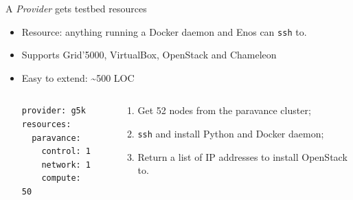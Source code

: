 \documentclass[10pt]{beamer}
\begin{document}
\begin{frame}[fragile]{\insertsectionhead}
  A \emph{Provider} gets testbed resources
  \begin{itemize}
	 \item Resource: anything running a Docker daemon and Enos can \texttt{ssh} to.
  \item Supports Grid'5000, VirtualBox, OpenStack and Chameleon
  \item Easy to extend: \textasciitilde 500 LOC
  \medskip
  \begin{columns}
    \footnotesize
    \begin{column}{.3\textwidth}
  \begin{lstlisting}
provider: g5k
resources:
  paravance:
    control: 1
    network: 1
    compute: 50
  \end{lstlisting}
    \end{column}
    \begin{column}{.05\textwidth}
      \Rightarrow
    \end{column}
    \begin{column}{.6\textwidth}
      \begin{enumerate}
      \item Get 52 nodes from the paravance cluster;
		\item \texttt{ssh} and install Python and Docker daemon;
      \item Return a list of IP addresses to install OpenStack to.
      \end{enumerate}
    \end{column}
  \end{columns}
  \end{itemize}
\end{frame}
\end{document}
